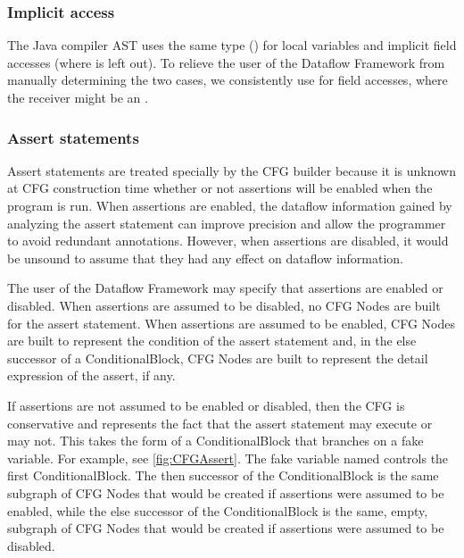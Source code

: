 

\subsubsection{Implicit  access}

The Java compiler AST uses the same type () for
local variables and implicit field accesses (where  is
left out).  To relieve the user of the Dataflow Framework from
manually determining the two cases, we consistently use
 for field accesses, where the receiver might be
an .


\subsubsection{Assert statements}
\label{sec:assert-stmts}

Assert statements are treated specially by the CFG builder because it
is unknown at CFG construction time whether or not assertions will be
enabled when the program is run.  When assertions are enabled, the
dataflow information gained by analyzing the assert statement can
improve precision and allow the programmer to avoid redundant
annotations.  However, when assertions are disabled, it would be
unsound to assume that they had any effect on dataflow information.

The user of the Dataflow Framework may specify that
assertions are enabled or disabled.  When assertions are assumed to be
disabled, no CFG Nodes are built for the assert statement.
When assertions are assumed to be enabled, CFG Nodes are built to
represent the condition of the assert statement and, in the else
successor of a ConditionalBlock, CFG Nodes are built to represent the
detail expression of the assert, if any.

If assertions are not assumed to be enabled or disabled, then
the CFG is conservative and represents the fact that the
assert statement may execute or may not.  This takes the form of a
ConditionalBlock that branches on a fake variable.  For example, see
\autoref{fig:CFGAssert}.  The fake variable named
 controls the first ConditionalBlock.
The then successor of the ConditionalBlock is the same subgraph of CFG
Nodes that would be created if assertions were assumed to be enabled,
while the else successor of the ConditionalBlock is the same, empty,
subgraph of CFG Nodes that would be created if assertions were assumed
to be disabled.

